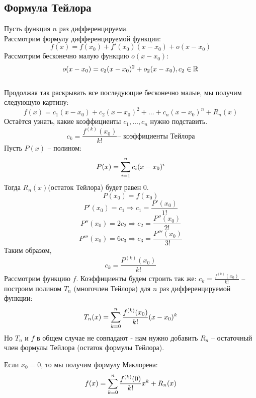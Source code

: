 \subsection{Формула Тейлора}
Пусть функция \( n \) раз дифференцируема. \\
Рассмотрим формулу дифференцируемой функции:
\[ f(x) = f(x_0) + f'(x_0)(x-x_0) + o(x-x_0) \]
Рассмотрим бесконечно малую функцию \( o(x-x_0) \):
\[ o(x-x_0) = c_2(x-x_0)^2 + o_2(x-x_0), c_2 \in \mathbb{R} \]
 \\ 
Продолжая так раскрывать все последующие бесконечно малые, мы получим следующую картину:
\[ f(x) = c_1(x-x_0)+c_2(x-x_0)^2+\dots+c_n(x-x_0)^n+R_n(x) \]
Остаётся узнать, какие коэффициенты \( c_{1}, \dots, c_{n} \) нужно подставить. \\ 
\[ c_k = \frac{f^{(k)}(x_0)}{k!} \text{-- коэффициенты Тейлора} \]
Пусть \( P(x) \) -- полином: 
\[ P(x) = \sum \limits_{i=1}^{n} {c_i(x-x_0)^i} \]
Тогда \( R_n(x) \)(остаток Тейлора) будет равен \( 0 \).
\[ P(x_0) = f(x_0) \]
\[ P'(x_0) = c_1 \Longrightarrow c_1 = \frac{P'(x_0)}{1!} \]
\[ P''(x_0) = 2c_2 \Longrightarrow c_2 = \frac{P''(x_0)}{2!} \]
\[ P'''(x_0) = 6c_3 \Longrightarrow c_3 = \frac{P'''(x_0)}{3!} \]
Таким образом, \[ c_k = \frac{P^{(k)}(x_0)}{k!} \]
Рассмотрим функцию \( f \). Коэффициенты будем строить так же: \( c_k  = \frac{f^{(k)}(x_0)}{k!}\) -- построим полином \( T_n \) (многочлен Тейлора) для \( n \) раз дифференцируемой функции:
\[ T_n(x) = \sum \limits_{k=0}^{n} {\frac{f^{(k)}(x_0)}{k!}(x-x_0)^k} \]
Но \( T_n \) и \( f \) в общем случае не совпадают - нам нужно добавить \( R_n \) -- остаточный член формулы Тейлора (остаток формулы Тейлора).
\begin{note} 
    Если \( x_0 = 0 \), то мы получим формулу Маклорена: %
    \[ f(x) = \sum \limits_{k=0}^{n} {\frac{f^{(k)}(0)}{k!}x^k} + R_n(x) \]
\end{note}
